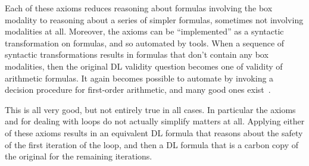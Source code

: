 \documentclass[11pt,twoside]{scrartcl}
\begin{document}
\begin{center}
  \begin{calculus}
{
  {}
}
{}%
{\linferenceRule[equiv]
  {(\ivr \land \ausfml)}
  {\axkey{\dbox{\passert{\ivr}}{\ausfml}}}
}{}%
{\linferenceRule[equiv]
  {(\ivr\limply\dbox{\ausprg}{\ausfml}) \land (\lnot\ivr\limply\dbox{\busprg}{\ausfml})}
  {\axkey{\dbox{\pif{\ivr}{\ausprg}{\busprg}}{\ausfml}}}
}{}%
{\linferenceRule[equiv]
  {\dbox{\ausprg}{\dbox{\busprg}{\ausfml}}}
  {\axkey{\dbox{\ausprg;\busprg}{\ausfml}}}
}{}%
{\linferenceRule[equiv]
  {\dbox{\pifs{\ivr}{\plgroup\ausprg;\pwhile{\ivr}{\ausprg}\prgroup}}{\ausfml}}
  {\axkey{\dbox{\pwhile{\ivr}{\ausprg}}{\ausfml}}}
}{}%
{\linferenceRule[equiv]
  {(\ivr\limply\dbox{\ausprg}{\dbox{\pwhile{\ivr}{\ausprg}}{\ausfml}}) \land (\lnot\ivr\limply\ausfml)}
  {\axkey{\dbox{\pwhile{\ivr}{\ausprg}}{\ausfml}}}
}{}%
  \end{calculus}
\end{center}

Each of these axioms reduces reasoning about formulas involving the box modality to reasoning about a series of simpler formulas, sometimes not involving modalities at all. Moreover, the axioms can be ``implemented'' as a syntactic transformation on formulas, and so automated by tools. When a sequence of syntactic transformations results in formulas that don't contain any box modalities, then the original DL validity question becomes one of validity of arithmetic formulas. It again becomes possible to automate by invoking a decision procedure for first-order arithmetic, and many good ones exist~\cite{z3}.

This is all very good, but not entirely true in all cases. In particular the axioms  and  for dealing with loops do not actually simplify matters at all. Applying either of these axioms results in an equivalent DL formula that reasons about the safety of the first iteration of the loop, and then a DL formula that is a carbon copy of the original for the remaining iterations.
\end{document}
